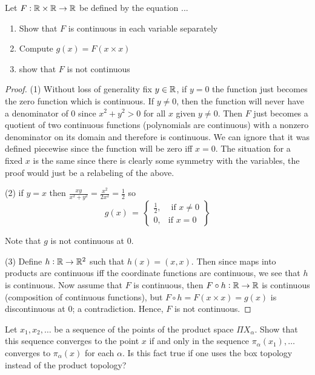     \question 
    Let $F: \mathbb{R} \times \mathbb{R} \to \mathbb{R}$ be defined by the equation ... 
    \begin{enumerate}
        \item Show that $F$ is continuous in each variable separately
        \item Compute $g(x) = F(x \times x)$ 
        \item show that $F$ is not continuous
    \end{enumerate}


    \begin{proof}
        (1) Without loss of generality fix $y \in \mathbb{R}$, if $y = 0$ the function just becomes the zero function which is continuous. If $y \neq 0$, then the function will never have a denominator of $0$ since $x^2 + y^2 > 0$ for all $x$ given $y \neq 0$. Then $F$ 
        just becomes a quotient of two continuous functions (polynomials are continuous) with a nonzero denominator on its domain and therefore is continuous. We can ignore that it was defined piecewise since the function will be zero iff $x = 0$. The situation for a fixed $x$ is the same since there is clearly some symmetry with the variables, 
        the proof would just be a relabeling of the above. 

        (2) if $y = x$ then $\frac{xy}{x^2 + y^2} = \frac{x^2}{2x^2} = \frac{1}{2}$ so
        \begin{equation}
                g(x) \, = \, 
                \left\{\begin{array}{lr}
                    \frac{1}{2}, & \text{ if } x \neq 0 \\
                    0, & \text{if } x = 0
                \end{array}\right\}
        \end{equation}

        Note that $g$ is not continuous at $0$.

        (3) Define $h: \mathbb{R} \to \mathbb{R}^2$ such that $h(x) = (x, x)$. Then since maps into products are continuous iff the coordinate functions are continuous, we see that $h$ is continuous. 
        Now assume that $F$ is continuous, then $F \circ h:\mathbb{R} \to \mathbb{R}$ is continuous (composition of continuous functions), but $F \circ h = F(x \times x) = g(x)$ is discontinuous at $0$; a contradiction. Hence, $F$ is not continuous. 

    \end{proof}


    \question 
    Let $x_1, x_2, \dots$ be a sequence of the points of the product space $\Pi X_\alpha$. Show that this sequence converges to the point $x$ if and only in the sequence $\pi_\alpha(x_1), \dots$ converges to $\pi_\alpha(x)$ for each $\alpha$. Is this fact true if one uses the 
    box topology instead of the product topology? 

